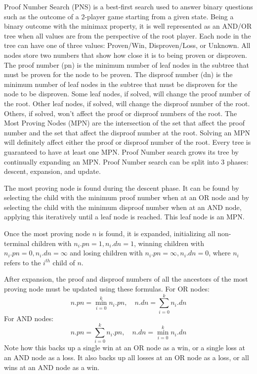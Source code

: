 Proof Number Search (PNS) is a best-first search used to answer binary questions such as the outcome of a 2-player game starting from a given state. Being a binary outcome with the minimax property, it is well represented as an AND/OR tree when all values are from the perspective of the root player. Each node in the tree can have one of three values: Proven/Win, Disproven/Loss, or Unknown. All nodes store two numbers that show how close it is to being proven or disproven. The proof number (pn) is the minimum number of leaf nodes in the subtree that must be proven for the node to be proven. The disproof number (dn) is the minimum number of leaf nodes in the subtree that must be disproven for the node to be disproven. Some leaf nodes, if solved, will change the proof number of the root. Other leaf nodes, if solved, will change the disproof number of the root. Others, if solved, won't affect the proof or disproof numbers of the root. The Most Proving Nodes (MPN) are the intersection of the set that affect the proof number and the set that affect the disproof number at the root. Solving an MPN will definitely affect either the proof or disproof number of the root. Every tree is guaranteed to have at least one MPN. Proof Number search grows its tree by continually expanding an MPN. Proof Number search can be split into 3 phases: descent, expansion, and update.

The most proving node is found during the descent phase. It can be found by selecting the child with the minimum proof number when at an OR node and by selecting the child with the minimum disproof number when at an AND node, applying this iteratively until a leaf node is reached. This leaf node is an MPN.

Once the most proving node $n$ is found, it is expanded, initializing all non-terminal children with $n_i.pn = 1, n_i.dn = 1$, winning children with $n_i.pn = 0, n_i.dn = \infty$ and losing children with $n_i.pn = \infty, n_i.dn = 0 $, where $n_i$ refers to the $i^{th}$ child of $n$.

After expansion, the proof and disproof numbers of all the ancestors of the most proving node must be updated using these formulas. For OR nodes: $$ n.pn = \displaystyle\min\limits_{i=0}^k n_i.pn,\quad n.dn = \displaystyle\sum\limits_{i=0}^k n_i.dn $$ For AND nodes: $$ n.pn = \displaystyle\sum\limits_{i=0}^k n_i.pn, \quad n.dn = \displaystyle\min\limits_{i=0}^k n_i.dn $$ Note how this backs up a single win at an OR node as a win, or a single loss at an AND node as a loss. It also backs up all losses at an OR node as a loss, or all wins at an AND node as a win. %

